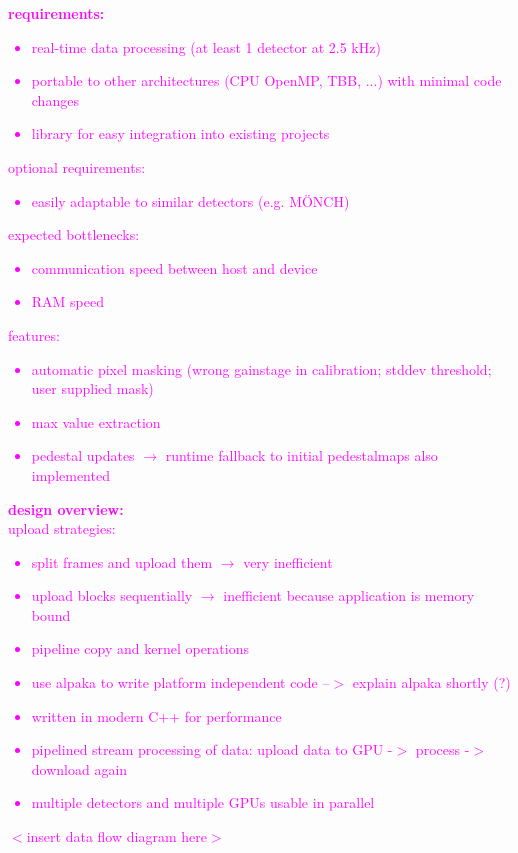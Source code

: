 \documentclass[a4paper]{article}
\begin{document}
\textcolor{magenta}{
\textbf{requirements:}
\begin{itemize}
	\item real-time data processing (at least 1 detector at 2.5 kHz)
	\item portable to other architectures (CPU OpenMP, TBB, ...) with minimal code changes
	\item library for easy integration into existing projects
\end{itemize}
optional requirements:
\begin{itemize}
	\item easily adaptable to similar detectors (e.g. MÖNCH)
\end{itemize}
expected bottlenecks:
\begin{itemize}
	\item communication speed between host and device
	\item RAM speed
\end{itemize}
features:
\begin{itemize}
	\item automatic pixel masking (wrong gainstage in calibration; stddev threshold; user supplied mask)
	\item max value extraction
	\item pedestal updates $\rightarrow$ runtime fallback to initial pedestalmaps also implemented
\end{itemize}
\textbf{design overview:}\\
upload strategies:
\begin{itemize}
	\item split frames and upload them $\rightarrow$ very inefficient
	\item upload blocks sequentially $\rightarrow$ inefficient because application is memory bound
	\item pipeline copy and kernel operations
\end{itemize}
\begin{itemize}
	\item use alpaka to write platform independent code --$>$ explain alpaka shortly (?)
	\item written in modern C++ for performance
	\item pipelined stream processing of data: upload data to GPU -$>$ process -$>$ download again
	\item multiple detectors and multiple GPUs usable in parallel
\end{itemize}
$<$insert data flow diagram here$>$ \\
}
\end{document}
